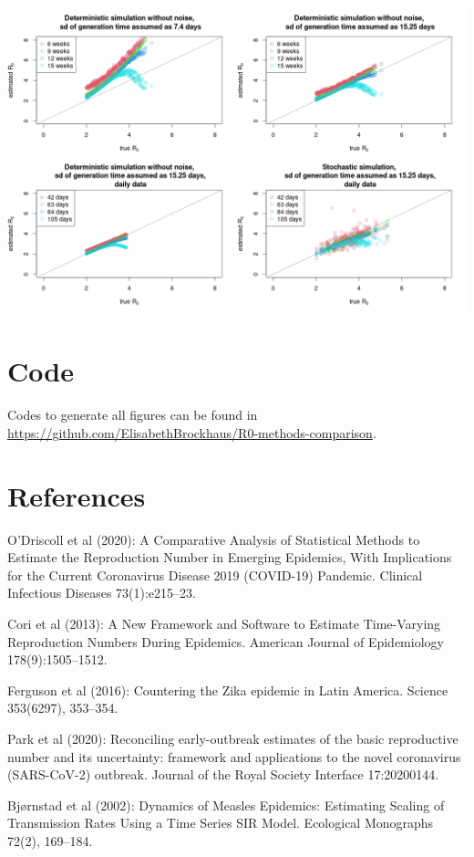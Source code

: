 \documentclass{article}
\begin{document}
\includegraphics[scale=0.34]{figures/scatterplots.png}

\section*{Code}

Codes to generate all figures can be found in \url{https://github.com/ElisabethBrockhaus/R0-methods-comparison}.

\section*{References}

\begin{description}
\item O'Driscoll et al (2020): A Comparative Analysis of Statistical Methods to Estimate the Reproduction Number in Emerging Epidemics, With Implications for the Current Coronavirus Disease 2019 (COVID-19) Pandemic. Clinical Infectious Diseases 73(1):e215–23.
\item Cori et al (2013): A New Framework and Software to Estimate Time-Varying Reproduction Numbers During Epidemics. American Journal of Epidemiology 178(9):1505--1512.
\item Ferguson et al (2016): Countering the Zika epidemic
in Latin America. Science 353(6297), 353--354.
\item Park et al (2020): Reconciling early-outbreak estimates of the basic reproductive number and its uncertainty: framework and applications to the novel coronavirus (SARS-CoV-2) outbreak. Journal of the Royal Society Interface 17:20200144.
\item Bj{\o}rnstad et al (2002): Dynamics of Measles Epidemics: Estimating Scaling of Transmission Rates Using a Time Series SIR Model.  Ecological Monographs 72(2), 169--184.
\end{description}
\end{document}
